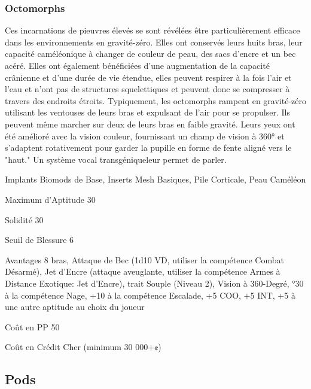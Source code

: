\subsubsection{Octomorphs} \label{sec:starting-octomorphs} 

Ces incarnations de pieuvres élevés se sont révélées être particulièrement efficace dans les environnements en gravité-zéro. Elles ont conservés leurs huits bras, leur capacité caméléonique à changer de couleur de peau, des sacs d'encre et un bec acéré. Elles ont également bénéficiées d'une augmentation de la capacité crânienne et d'une durée de vie étendue, elles peuvent respirer à la fois l'air et l'eau et n'ont pas de structures squelettiques et peuvent donc se compresser à travers des endroits étroits. Typiquement, les octomorphs rampent en gravité-zéro utilisant les ventouses de leurs bras et expulsant de l'air pour se propulser. Ils peuvent même marcher sur deux de leurs bras en faible gravité. Leurs yeux ont été amélioré avec la vision couleur, fournissant un champ de vision à 360° et s'adaptent rotativement pour garder la pupille en forme de fente aligné vers le "haut." Un système vocal transgéniqueleur permet de parler. 

\begin{description*} \item[Implants] Biomods de Base, Inserts Mesh Basiques, Pile Corticale, Peau Caméléon\item[Maximum d'Aptitude] 30 \item[Solidité] 30 \item[Seuil de Blessure] 6 \item[Avantages] 8 bras, Attaque de Bec (1d10 VD, utiliser la compétence Combat Désarmé), Jet d'Encre (attaque aveuglante, utiliser la compétence Armes à Distance Exotique: Jet d'Encre), trait Souple (Niveau 2), Vision à 360-Degré, °30 à la compétence Nage, +10 à la compétence Escalade, +5 COO, +5 INT, +5 à une autre aptitude au choix du joueur\item[Coût en PP] 50 \item[Coût en Crédit] Cher (minimum 30 000+¢) \end{description*} 

\subsection{Pods} \label{sec:starting-pods} 

